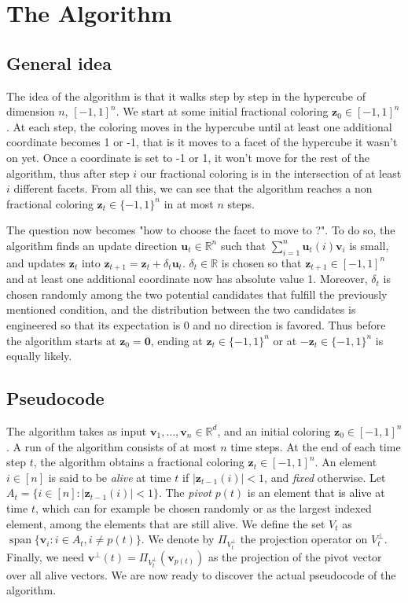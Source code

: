 \documentclass[12pt]{article}
\DeclareMathOperator{\Span}{span}
\begin{document}
\section{The Algorithm}
\subsection{General idea}
The idea of the algorithm is that it walks step by step in the hypercube of dimension $n$, $[-1,1]^n$. We start at some initial fractional coloring $\textbf{z}_0\in[-1,1]^n$. At each step, the coloring moves in the hypercube until at least one additional coordinate becomes 1 or -1, that is it moves to a facet of the hypercube it wasn't on yet. Once a coordinate is set to -1 or 1, it won't move for the rest of the algorithm, thus after step $i$ our fractional coloring is in the intersection of at least $i$ different facets. From all this, we can see that the algorithm reaches a non fractional coloring $\textbf{z}_t\in\{-1,1\}^n$ in at most $n$ steps.

The question now becomes "how to choose the facet to move to ?". To do so, the algorithm finds an update direction $\textbf{u}_t\in\mathbb{R}^n$ such that $\sum_{i=1}^n\textbf{u}_t(i)\textbf{v}_i$ is small, and updates $\textbf{z}_t$ into $\textbf{z}_{t+1}=\textbf{z}_t+\delta_t\textbf{u}_t$. $\delta_t\in\mathbb{R}$ is chosen so that $\textbf{z}_{t+1}\in[-1,1]^n$ and at least one additional coordinate now has absolute value 1. Moreover, $\delta_t$ is chosen randomly among the two potential candidates that fulfill the previously mentioned condition, and the distribution between the two candidates is engineered so that its expectation is 0 and no direction is favored. Thus before the algorithm starts at $\textbf{z}_0=\textbf{0}$, ending at $\textbf{z}_t\in\{-1,1\}^n$ or at $-\textbf{z}_t\in\{-1,1\}^n$ is equally likely.

\subsection{Pseudocode}
The algorithm takes as input $\textbf{v}_1,\ldots,\textbf{v}_n\in\mathbb{R}^d$, and an initial coloring $\textbf{z}_0\in[-1,1]^n$. A run of the algorithm consists of at most $n$ time steps. At the end of each time step $t$, the algorithm obtains a fractional coloring $\textbf{z}_t\in[-1,1]^n$. An element $i \in [n]$ is said to be \textit{alive} at time $t$ if $|\textbf{z}_{t-1}(i)|<1$, and \textit{fixed} otherwise. Let $A_t=\{i\in[n]:|\textbf{z}_{t-1}(i)|<1\}$. The \textit{pivot} $p(t)$ is an element that is alive at time $t$, which can for example be chosen randomly or as the largest indexed element, among the elements that are still alive. We define the set $V_t$ as $\Span\{\textbf{v}_i:i\in A_t,i\not=p(t)\}$. We denote by $\Pi_{V_t^\perp}$ the projection operator on $V_t^\perp$. Finally, we need $\textbf{v}^{\perp}(t)=\Pi_{V_t^\perp}(\textbf{v}_{p(t)})$ as the projection of the pivot vector over all alive vectors. We are now ready to discover the actual pseudocode of the algorithm.
\end{document}
